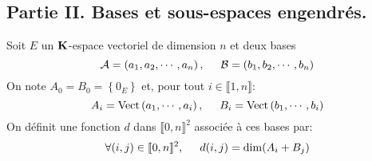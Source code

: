 \subsection*{Partie II. Bases et sous-espaces engendrés.}
Soit $E$ un $\mathbf{K}$-espace vectoriel de dimension $n$ et deux bases 
\begin{displaymath}
  \mathcal{A} = \left(  a_1, a_2, \cdots, a_n\right) , \hspace{0.5cm} \mathcal{B} = \left(  b_1, b_2, \cdots , b_n\right) 
\end{displaymath}
On note $A_0=B_0 = \left\lbrace 0_E\right\rbrace$ et, pour tout $i\in \llbracket 1, n\rrbracket$:
\begin{displaymath}
  A_i = \operatorname{Vect}\left(a_1,\cdots, a_i \right), \hspace{0.5cm} B_i = \operatorname{Vect}\left(b_1,\cdots, b_i \right)
\end{displaymath}
On définit une fonction $d$ dans $\llbracket 0, n \rrbracket^2$ associée à ces bases par:
\begin{displaymath}
  \forall (i,j) \in \llbracket 0, n \rrbracket^2, \hspace{0.5cm} d(i,j) = \dim(A_i + B_j) 
\end{displaymath}

